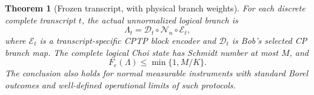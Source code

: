 \documentclass[11pt]{article}
\newtheorem{theorem}{Theorem}[section]
\newcommand{\cN}{\mathcal N}
\begin{document}
\begin{theorem}[Frozen transcript, with physical branch weights]\label{thm:transcript}
For each discrete complete transcript $t$, the actual unnormalized logical branch is
\begin{equation}
 \Lambda_t=\mathcal D_t\circ\cN_n\circ\mathcal E_t,\label{eq:factor}
\end{equation}
where $\mathcal E_t$ is a transcript-specific CPTP block encoder and $\mathcal D_t$ is Bob's selected CP branch map. The complete logical Choi state has Schmidt number at most $M$, and
\begin{equation}
 F_e(\Lambda)\le\min\{1,M/K\}.\label{eq:feedbackbound}
\end{equation}
The conclusion also holds for normal measurable instruments with standard Borel outcomes and well-defined operational limits of such protocols.
\end{theorem}
\end{document}
